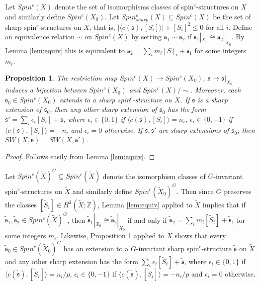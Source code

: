 \documentclass{amsart}
\newtheorem{proposition}[theorem]{Proposition}
\theoremstyle{definition}
\theoremstyle{remark}
\numberwithin{equation}{section}
\begin{document}
Let $Spin^c(X)$ denote the set of isomorphisms classes of spin$^c$-structures on $X$ and similarly define $Spin^c(X_0)$. Let $Spin^c_{sharp}(X) \subseteq Spin^c(X)$ be the set of sharp spin$^c$-structures on $X$, that is, $| \langle c(\mathfrak{s}) , [S_i] \rangle | + [S_i]^2 \le 0$ for all $i$. Define an equivalence relation $\sim$ on $Spin^c(X)$ by setting $\mathfrak{s}_1 \sim \mathfrak{s}_2$ if $\mathfrak{s}_1 |_{X_0} \cong \mathfrak{s}_2 |_{X_0}$. By Lemma \ref{lem:equiv} this is equivalent to $\mathfrak{s}_2 = \sum_i m_i [S]_i + \mathfrak{s}_1$ for some integers $m_i$.

\begin{proposition}\label{prop:spincext}
The restriction map $Spin^c(X) \to Spin^c(X_0)$, $\mathfrak{s} \mapsto \mathfrak{s}|_{X_0}$ induces a bijection between $Spin^c(X_0)$ and $Spin^c(X)/\! \! \sim$. Moreover, each $\mathfrak{s}_0 \in Spin^c(X_0)$ extends to a sharp spin$^c$-structure on $X$. If $\mathfrak{s}$ is a sharp extension of $\mathfrak{s}_0$, then any other sharp extension of $\mathfrak{s}_0$ has the form $\mathfrak{s}' = \sum_i \epsilon_i[S_i] + \mathfrak{s}$, where $\epsilon_i \in \{0,1\}$ if $\langle c(\mathfrak{s}) , [S_i] \rangle = n_i$, $\epsilon_i \in \{0, -1\}$ if $\langle c(\mathfrak{s}) , [S_i] \rangle = -n_i$ and $\epsilon_i = 0$ otherwise. If $\mathfrak{s}, \mathfrak{s}'$ are sharp extensions of $\mathfrak{s}_0$, then $SW(X , \mathfrak{s}) = SW(X , \mathfrak{s}')$.
\end{proposition}
\begin{proof}
Follows easily from Lemma \ref{lem:equiv}.
\end{proof}

Let $Spin^c( \widetilde{X} )^G \subseteq Spin^c(\widetilde{X})$ denote the isomorphism classes of $G$-invariant spin$^c$-structures on $\widetilde{X}$ and similarly define $Spin^c(\widetilde{X}_0)^G$. Then since $G$ preserves the classes $[\widetilde{S}_i] \in H^2( \widetilde{X} ; \mathbb{Z})$, Lemma \ref{lem:equiv} applied to $\widetilde{X}$ implies that if $\widetilde{\mathfrak{s}}_1, \widetilde{\mathfrak{s}}_2 \in Spin^c(\widetilde{X})^G$, then $\widetilde{\mathfrak{s}}_1 |_{\widetilde{X}_0} \cong \widetilde{\mathfrak{s}}_2 |_{\widetilde{X}_0}$ if and only if $\widetilde{\mathfrak{s}}_2 = \sum_i m_i [\widetilde{S}_i] + \widetilde{\mathfrak{s}}_1$ for some integers $m_i$. Likewise, Proposition \ref{prop:spincext} applied to $\widetilde{X}$ shows that every $\widetilde{\mathfrak{s}}_0 \in Spin^c( \widetilde{X}_0)^G$ has an extension to a $G$-invariant sharp spin$^c$-structure $\widetilde{\mathfrak{s}}$ on $\widetilde{X}$ and any other sharp extension has the form $\sum_i \epsilon_i[\widetilde{S}_i] + \widetilde{\mathfrak{s}}$, where $\epsilon_i \in \{ 0, 1\}$ if $\langle c(\widetilde{\mathfrak{s}}) , [\widetilde{S}_i] \rangle = n_i/p$, $\epsilon_i \in \{ 0, -1\}$ if $\langle c(\widetilde{\mathfrak{s}}) , [\widetilde{S}_i] \rangle = -n_i/p$ and $\epsilon_i = 0$ otherwise.
\end{document}
